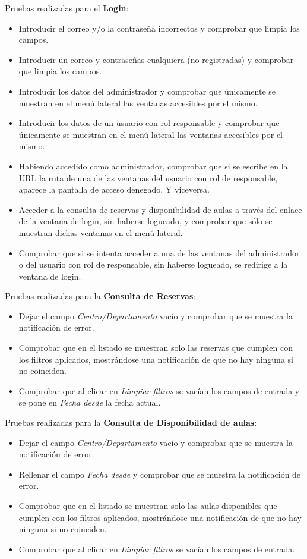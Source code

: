 Pruebas realizadas para el \textbf{Login}:
\begin{itemize}
    \item Introducir el correo y/o la contraseña incorrectos y comprobar que limpia los campos.
    \item Introducir un correo y contraseñas cualquiera (no registradas) y comprobar que limpia los campos.
    \item Introducir los datos del administrador y comprobar que únicamente se muestran en el menú lateral las ventanas accesibles por el mismo. 
    \item Introducir los datos de un usuario con rol responsable y comprobar que únicamente se muestran en el menú lateral las ventanas accesibles por el mismo.
    \item Habiendo accedido como administrador, comprobar que si se escribe en la URL la ruta de una de las ventanas del usuario con rol de responsable, aparece la pantalla de acceso denegado. Y viceversa.
    \item Acceder a la consulta de reservas y disponibilidad de aulas a través del enlace de la ventana de login, sin haberse logueado, y comprobar que sólo se muestran dichas ventanas en el menú lateral. 
    \item Comprobar que si se intenta acceder a una de las ventanas del administrador o del usuario con rol de responsable, sin haberse logueado, se redirige a la ventana de login.
\end{itemize}

Pruebas realizadas para la \textbf{Consulta de Reservas}:
\begin{itemize}
    \item Dejar el campo \textit{Centro/Departamento} vacío y comprobar que se muestra la notificación de error.
    \item Comprobar que en el listado se muestran solo las reservas que cumplen con los filtros aplicados, mostrándose una notificación de que no hay ninguna si no coinciden.
    \item Comprobar que al clicar en \textit{Limpiar filtros} se vacían los campos de entrada y se pone en \textit{Fecha desde} la fecha actual.
\end{itemize}

Pruebas realizadas para la \textbf{Consulta de Disponibilidad de aulas}:
\begin{itemize}
    \item Dejar el campo \textit{Centro/Departamento} vacío y comprobar que se muestra la notificación de error.
    \item Rellenar el campo \textit{Fecha desde} y comprobar que se muestra la notificación de error.
    \item Comprobar que en el listado se muestran solo las aulas disponibles que cumplen con los filtros aplicados, mostrándose una notificación de que no hay ninguna si no coinciden.
    \item Comprobar que al clicar en \textit{Limpiar filtros} se vacían los campos de entrada.
\end{itemize}


